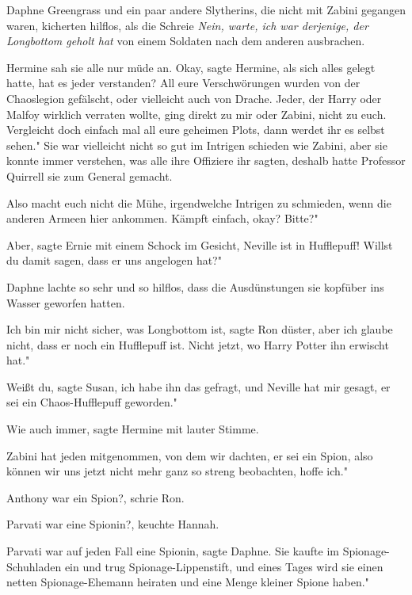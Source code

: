 Daphne Greengrass und ein paar andere Slytherins, die nicht mit Zabini gegangen
waren, kicherten hilflos, als die Schreie \glqq \emph{Nein, warte, ich war
derjenige, der Longbottom geholt hat\grqq{} } von einem Soldaten nach dem
anderen ausbrachen.

Hermine sah sie alle nur müde an. \glqq Okay\grqq{}, sagte Hermine, als sich
alles gelegt hatte, \glqq hat es jeder verstanden? All eure Verschwörungen
wurden von der Chaoslegion gefälscht, oder vielleicht auch von Drache. Jeder,
der Harry oder Malfoy wirklich verraten wollte, ging direkt zu mir oder Zabini,
nicht zu euch. Vergleicht doch einfach mal all eure geheimen Plots, dann werdet
ihr es selbst sehen." Sie war vielleicht nicht so gut im Intrigen schieden wie
Zabini, aber sie konnte immer verstehen, was alle ihre Offiziere ihr sagten,
deshalb hatte Professor Quirrell sie zum General gemacht.

\glqq Also macht euch nicht die Mühe, irgendwelche Intrigen zu schmieden, wenn
die anderen Armeen hier ankommen. Kämpft einfach, okay? Bitte?"

\glqq Aber\grqq{}, sagte Ernie mit einem Schock im Gesicht, \glqq Neville ist in
Hufflepuff! Willst du damit sagen, dass er uns angelogen hat?"

Daphne lachte so sehr und so hilflos, dass die Ausdünstungen sie kopfüber ins
Wasser geworfen hatten.

\glqq Ich bin mir nicht sicher, was Longbottom ist\grqq{}, sagte Ron düster,
\glqq aber ich glaube nicht, dass er noch ein Hufflepuff ist. Nicht jetzt, wo
Harry Potter ihn erwischt hat."

\glqq Weißt du\grqq{}, sagte Susan, \glqq ich habe ihn das gefragt, und Neville
hat mir gesagt, er sei ein Chaos-Hufflepuff geworden."

\glqq Wie auch immer\grqq{}, sagte Hermine mit lauter Stimme.

\glqq Zabini hat jeden mitgenommen, von dem wir dachten, er sei ein Spion, also
können wir uns jetzt nicht mehr ganz so streng beobachten, hoffe ich."

\glqq Anthony war ein Spion?\grqq{}, schrie Ron.

\glqq Parvati war eine Spionin?\grqq{}, keuchte Hannah.

\glqq Parvati war auf jeden Fall eine Spionin\grqq{}, sagte Daphne. \glqq Sie
kaufte im Spionage-Schuhladen ein und trug Spionage-Lippenstift, und eines Tages
wird sie einen netten Spionage-Ehemann heiraten und eine Menge kleiner Spione
haben."

